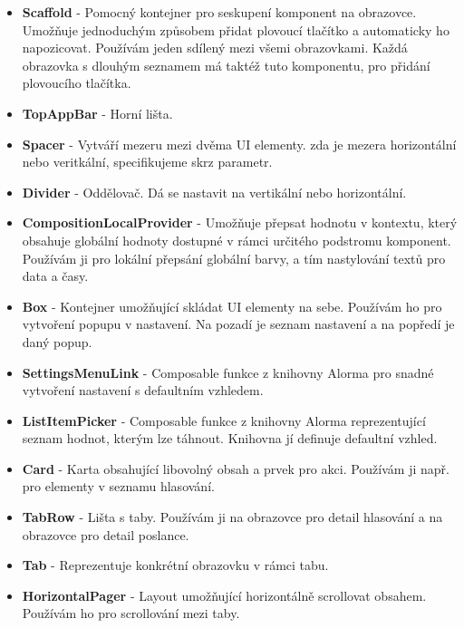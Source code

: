 \begin{itemize}
	\item \textbf{Scaffold} - Pomocný kontejner pro seskupení komponent na obrazovce. Umožňuje jednoduchým způsobem přidat plovoucí tlačítko a automaticky ho napozicovat. Používám jeden sdílený mezi všemi obrazovkami. Každá obrazovka s dlouhým seznamem má taktéž tuto komponentu, pro přidání plovoucího tlačítka.

	\item \textbf{TopAppBar} - Horní lišta.

	\item \textbf{Spacer} - Vytváří mezeru mezi dvěma UI elementy. zda je mezera horizontální nebo veritkální, specifikujeme skrz parametr.

	\item \textbf{Divider} - Oddělovač. Dá se nastavit na vertikální nebo horizontální.

	\item \textbf{CompositionLocalProvider} - Umožňuje přepsat hodnotu v kontextu, který obsahuje globální hodnoty dostupné v rámci určitého podstromu komponent. Používám ji pro lokální přepsání globální barvy, a tím nastylování textů pro data a časy.

	\item \textbf{Box} - Kontejner umožňující skládat UI elementy na sebe. Používám ho pro vytvoření popupu v nastavení. Na pozadí je seznam nastavení a na popředí je daný popup.

	\item \textbf{SettingsMenuLink} - Composable funkce z knihovny Alorma \cite{alorma} pro snadné vytvoření nastavení s defaultním vzhledem.

	\item \textbf{ListItemPicker} - Composable funkce z knihovny Alorma reprezentující seznam \linebreak hodnot, kterým lze táhnout. Knihovna jí definuje defaultní vzhled.

	\item \textbf{Card} - Karta obsahující libovolný obsah a prvek pro akci. Používám ji např. pro elementy \linebreak v seznamu hlasování.

	\item \textbf{TabRow} - Lišta s taby. Používám ji na obrazovce pro detail hlasování a na obrazovce pro detail poslance.

	\item \textbf{Tab} - Reprezentuje konkrétní obrazovku v rámci tabu.

	\item \textbf{HorizontalPager} - Layout umožňující horizontálně scrollovat obsahem. Používám ho pro scrollování mezi taby.
\end{itemize}


